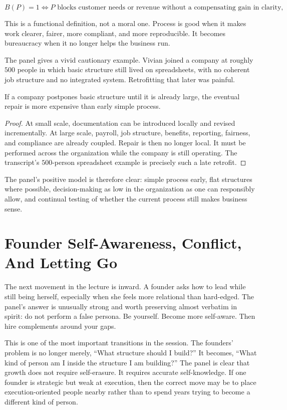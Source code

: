 \begin{equation}
B(P)=1
\iff
P \text{ blocks customer needs or revenue without a compensating gain in clarity, fairness, or compliance.}
\end{equation}

This is a functional definition, not a moral one. Process is good when it makes work clearer, fairer, more compliant, and more reproducible. It becomes bureaucracy when it no longer helps the business run.

The panel gives a vivid cautionary example. Vivian joined a company at roughly \(500\) people in which basic structure still lived on spreadsheets, with no coherent job structure and no integrated system. Retrofitting that later was painful.

\begin{proposition}
If a company postpones basic structure until it is already large, the eventual repair is more expensive than early simple process.
\end{proposition}

\begin{proof}
At small scale, documentation can be introduced locally and revised incrementally. At large scale, payroll, job structure, benefits, reporting, fairness, and compliance are already coupled. Repair is then no longer local. It must be performed across the organization while the company is still operating. The transcript's \(500\)-person spreadsheet example is precisely such a late retrofit.
\end{proof}

The panel's positive model is therefore clear: simple process early, flat structures where possible, decision-making as low in the organization as one can responsibly allow, and continual testing of whether the current process still makes business sense.

\section{Founder Self-Awareness, Conflict, And Letting Go}

The next movement in the lecture is inward. A founder asks how to lead while still being herself, especially when she feels more relational than hard-edged. The panel's answer is unusually strong and worth preserving almost verbatim in spirit: do not perform a false persona. Be yourself. Become more self-aware. Then hire complements around your gaps.

This is one of the most important transitions in the session. The founders' problem is no longer merely, ``What structure should I build?'' It becomes, ``What kind of person am I inside the structure I am building?'' The panel is clear that growth does not require self-erasure. It requires accurate self-knowledge. If one founder is strategic but weak at execution, then the correct move may be to place execution-oriented people nearby rather than to spend years trying to become a different kind of person.

